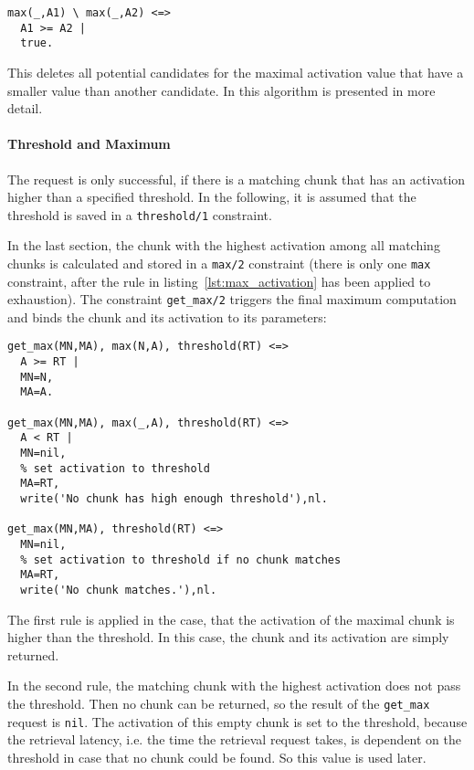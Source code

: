 \begin{lstlisting}[caption={Calculate highest activation of all matching chunks}, label=lst:max_activation]
max(_,A1) \ max(_,A2) <=> 
  A1 >= A2 |
  true.
\end{lstlisting}

This deletes all potential candidates for the maximal activation value that have a smaller value than another candidate. In \cite[19\psqq]{fru_chr_book_2009} this algorithm is presented in more detail.

\paragraph{Threshold and Maximum}

The request is only successful, if there is a matching chunk that has an activation higher than a specified threshold. In the following, it is assumed that the threshold is saved in a \lstinline|threshold/1| constraint.

In the last section, the chunk with the highest activation among all matching chunks is calculated and stored in a \lstinline|max/2| constraint (there is only one \lstinline|max| constraint, after the rule in listing~\ref{lst:max_activation} has been applied to exhaustion). The constraint \lstinline|get_max/2| triggers the final maximum computation and binds the chunk and its activation to its parameters:

\begin{lstlisting}
get_max(MN,MA), max(N,A), threshold(RT) <=> 
  A >= RT | 
  MN=N,
  MA=A.
  
get_max(MN,MA), max(_,A), threshold(RT) <=> 
  A < RT | 
  MN=nil,
  % set activation to threshold
  MA=RT,
  write('No chunk has high enough threshold'),nl.
  
get_max(MN,MA), threshold(RT) <=>
  MN=nil,
  % set activation to threshold if no chunk matches
  MA=RT,
  write('No chunk matches.'),nl.
\end{lstlisting}

The first rule is applied in the case, that the activation of the maximal chunk is higher than the threshold. In this case, the chunk and its activation are simply returned.

In the second rule, the matching chunk with the highest activation does not pass the threshold. Then no chunk can be returned, so the result of the \lstinline|get_max| request is \lstinline|nil|. The activation of this empty chunk is set to the threshold, because the retrieval latency, i.e. the time the retrieval request takes, is dependent on the threshold in case that no chunk could be found. So this value is used later.

